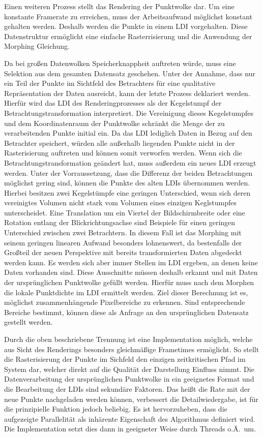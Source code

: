 \documentclass[hyperref, beleg, german]{cgvpub}
\begin{document}
Einen weiteren Prozess stellt das Rendering der Punktwolke dar. Um eine
konstante Framerate zu erreichen, muss der Arbeitsaufwand möglichst konstant
gehalten werden. Deshalb werden die Punkte in einem LDI vorgehalten. Diese
Datenstruktur ermöglicht eine einfache Rasterrisierung und die Anwendung der
Morphing Gleichung.

Da bei großen Datenwolken Speicherknappheit auftreten würde, muss eine
Selektion aus dem gesamten Datensatz geschehen. Unter der Annahme, dass nur ein
Teil der Punkte im Sichtfeld des Betrachters für eine qualitative
Repräsentation der Daten ausreicht, kann der letzte Prozess deklariert werden.
Hierfür wird das LDI des Renderingprozesses als der Kegelstumpf der
Betrachtungstransformation interpretiert. Die Vereinigung dieses Kegelstumpfes
und dem Koordinatenraum der Punktwolke schränkt die Menge der zu verarbeitenden
Punkte initial ein. Da das LDI lediglich Daten in Bezug auf den Betrachter
speichert, würden alle außerhalb liegenden Punkte nicht in der Rasterisierung
auftreten und können somit verworfen werden. Wenn sich die
Betrachtungstransformation geändert hat, muss außerdem ein neues LDI erzeugt
werden. Unter der Vorraussetzung, dass die Differenz der beiden Betrachtungen
möglichst gering sind, können die Punkte des alten LDIs übernommen werden.
Hierbei besitzen zwei Kegelstümpfe eine geringen Unterschied, wenn sich deren
vereinigtes Volumen nicht stark vom Volumen eines einzigen Keglstumpfes
unterscheidet. Eine Translation um ein Viertel der Bildschirmbreite oder eine
Rotation entlang der Blickrichtungsachse sind Beispiele für einen geringen
Unterschied zwischen zwei Betrachtern. In diesem Fall ist das Morphing mit
seinem geringen linearen Aufwand besonders lohnenswert, da bestenfalls der
Großteil der neuen Perspektive mit bereits transformierten Daten abgedeckt
werden kann. Es werden sich aber immer Stellen im LDI ergeben, an denen keine
Daten vorhanden sind. Diese Ausschnitte müssen deshalb erkannt und mit Daten
der ursprünglichen Punktwolke gefüllt werden. Hierfür muss nach dem Morphen die
lokale Punktdichte im LDI ermittelt werden. Ziel dieser Berechnung ist es,
möglichst zusammenhängende Pixelbereiche zu erkennen. Sind entsprechende
Bereiche bestimmt, können diese als Anfrage an den ursprünglichen Datensatz
gestellt werden.

Durch die oben beschriebene Trennung ist eine Implementation möglich, welche
aus Sicht des Renderings besonders gleichmäßige Frametimes ermöglicht. So
stellt die Rasterisierung der Punkte im Sichfeld den einzigen zeitkritischen
Pfad im System dar, welcher direkt auf die Qualität der Darstellung Einfluss
nimmt. Die Datenverarbeitung der ursprünglichen Punktwolke in ein geeignetes
Format und die Bearbeitung der LDIs sind sekundäre Faktoren. Das heißt die Rate
mit der neue Punkte nachgeladen werden können, verbessert die Detailwiedergabe,
ist für die prinzipielle Funktion jedoch beliebig. Es ist hervorzuheben,
dass die aufgezeigte Parallelität als inhärente Eigenschaft des Algorithmus
definiert wird. Die Implementation setzt dies dann in geeigneter Weise durch
Threads o.Ä.\ um.
\end{document}
